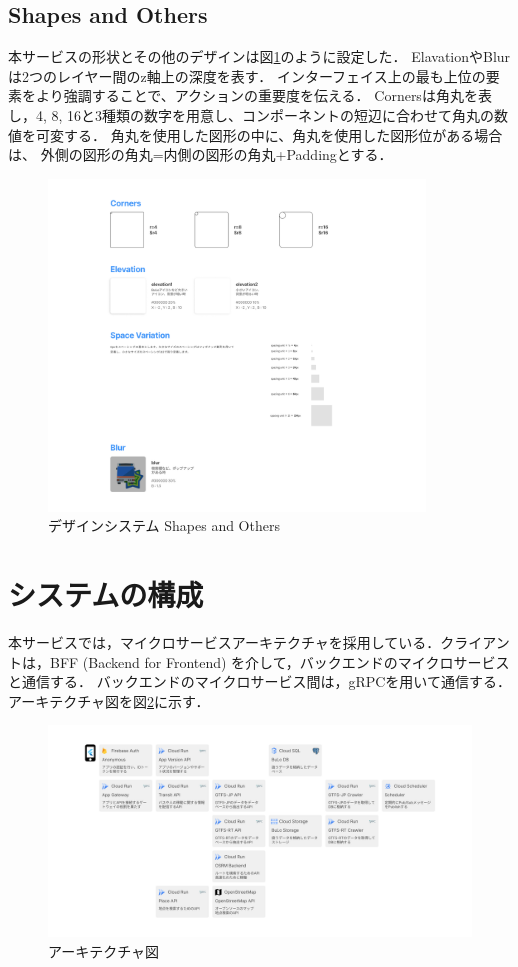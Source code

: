 \subsection{Shapes and Others}
    本サービスの形状とその他のデザインは図\ref{fig:shapes}のように設定した．
    ElavationやBlurは2つのレイヤー間のz軸上の深度を表す．
    インターフェイス上の最も上位の要素をより強調することで、アクションの重要度を伝える．
    Cornersは角丸を表し，4, 8, 16と3種類の数字を用意し、コンポーネントの短辺に合わせて角丸の数値を可変する．
    角丸を使用した図形の中に、角丸を使用した図形位がある場合は、
    外側の図形の角丸=内側の図形の角丸+Paddingとする．
    \begin{figure}
        \centering
        \includegraphics[width=10cm]{images/shapes.png}
        \caption{デザインシステム Shapes and Others}
        \label{fig:shapes}
    \end{figure}

\section{システムの構成}
本サービスでは，マイクロサービスアーキテクチャを採用している．クライアントは，BFF (Backend for Frontend) を介して，バックエンドのマイクロサービスと通信する．
バックエンドのマイクロサービス間は，gRPCを用いて通信する．アーキテクチャ図を図\ref{fig:architecture}に示す．
\begin{figure}
    \centering
    \includegraphics[width=14cm]{images/architecture_diagram.png}
    \caption{アーキテクチャ図}
    \label{fig:architecture}
\end{figure}

